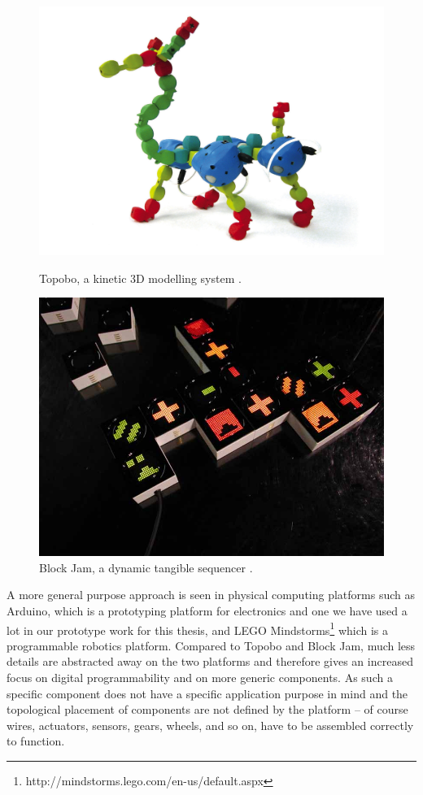 \begin{figure}[h]
\centering
\begin{minipage}[t]{.5\textwidth}
  \centering
  \includegraphics[width=.9\linewidth]{figures/proto3/topobo}
  \caption{Topobo, a kinetic 3D modelling system \citep{raffle2004topobo}.}
  \label{topobo}
\end{minipage}%
\begin{minipage}[t]{.5\textwidth}
  \centering
  \includegraphics[width=.9\linewidth]{figures/proto3/blockjam}
  \caption{Block Jam, a dynamic tangible sequencer \citep{newton2003block}.}
  \label{blockjam}
\end{minipage}
\end{figure}

A more general purpose approach is seen in physical computing platforms such as Arduino, which is a prototyping platform for electronics and one we have used a lot in our prototype work for this thesis, and LEGO Mindstorms\footnote{http://mindstorms.lego.com/en-us/default.aspx} which is a programmable robotics platform.
Compared to Topobo and Block Jam, much less details are abstracted away on the two platforms and therefore gives an increased focus on digital programmability and on more generic components.
As such a specific component does not have a specific application purpose in mind and the topological placement of components are not defined by the platform -- of course wires, actuators, sensors, gears, wheels, and so on, have to be assembled correctly to function.

